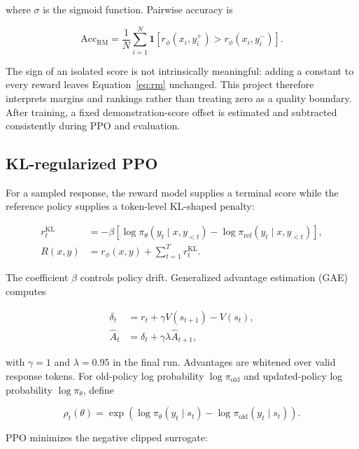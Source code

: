 \documentclass[11pt]{article}
\begin{document}
where $\sigma$ is the sigmoid function. Pairwise accuracy is

\begin{equation}
\mathrm{Acc}_{\mathrm{RM}}
=
\frac{1}{N}\sum_{i=1}^{N}
\mathbf{1}
\left[
r_\phi(x_i,y_i^+) > r_\phi(x_i,y_i^-)
\right].
\end{equation}

The sign of an isolated score is not intrinsically meaningful: adding a
constant to every reward leaves Equation~\ref{eq:rm} unchanged. This project
therefore interprets margins and rankings rather than treating zero as a
quality boundary. After training, a fixed demonstration-score offset is
estimated and subtracted consistently during PPO and evaluation.

\subsection{KL-regularized PPO}

For a sampled response, the reward model supplies a terminal score while the
reference policy supplies a token-level KL-shaped penalty:

\begin{align}
r_t^{\mathrm{KL}}
&=
-\beta\left[
\log \pi_\theta(y_t\mid x,y_{<t})
-
\log \pi_{\mathrm{ref}}(y_t\mid x,y_{<t})
\right],\\
R(x,y)
&=
r_\phi(x,y) + \sum_{t=1}^{T}r_t^{\mathrm{KL}}.
\label{eq:rlhf-reward}
\end{align}

The coefficient $\beta$ controls policy drift. Generalized advantage
estimation (GAE) computes

\begin{align}
\delta_t &= r_t + \gamma V(s_{t+1}) - V(s_t),\\
\hat{A}_t &= \delta_t + \gamma\lambda \hat{A}_{t+1},
\end{align}

with $\gamma=1$ and $\lambda=0.95$ in the final run. Advantages are whitened
over valid response tokens. For old-policy log probability
$\log\pi_{\mathrm{old}}$ and updated-policy log probability
$\log\pi_\theta$, define

\begin{equation}
\rho_t(\theta)
=
\exp\left(
\log\pi_\theta(y_t\mid s_t)
-
\log\pi_{\mathrm{old}}(y_t\mid s_t)
\right).
\end{equation}

PPO minimizes the negative clipped surrogate:
\end{document}
